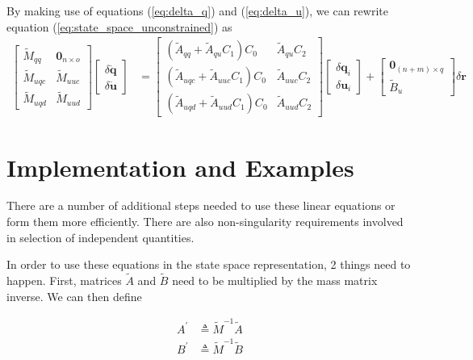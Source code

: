 \documentclass{svjour3}                     %
\begin{document}
By making use of equations (\ref{eq:delta_q}) and (\ref{eq:delta_u}), we can
rewrite equation (\ref{eq:state_space_unconstrained}) as
\begin{align}
  \label{eq:state_space_constrained}
  \left[
    \begin{array}{cc}
      \tilde{M}_{qq} & \bm{0}_{n \times o} \\
      \tilde{M}_{uqc} & \tilde{M}_{uuc} \\
      \tilde{M}_{uqd} & \tilde{M}_{uud}
    \end{array}
    \right]
    \left[
      \begin{array}{c}
        \delta \bm{\dot{q}} \\
        \delta \bm{\dot{u}}
      \end{array}
    \right]
   &=
   \left[
     \begin{array}{cc}
       (\tilde{A}_{qq} + \tilde{A}_{qu} C_1 ) C_0 & \tilde{A}_{qu} C_2 \\
       (\tilde{A}_{uqc} + \tilde{A}_{uuc} C_1 ) C_0 & \tilde{A}_{uuc} C_2\\
       (\tilde{A}_{uqd} + \tilde{A}_{uud} C_1 ) C_0 & \tilde{A}_{uud} C_2
     \end{array}
   \right]
    \left[
      \begin{array}{c}
        \delta \bm{q}_i \\
        \delta \bm{u}_i
      \end{array}
    \right]
    +
    \left[
      \begin{array}{c}
        \bm{0}_{(n+m) \times q} \\
        \tilde{B}_{u}
      \end{array}
    \right]
    \delta \bm{r}
\end{align}


\section{Implementation and Examples}

There are a number of additional steps needed to use these linear equations or
form them more efficiently. There are also non-singularity requirements
involved in selection of independent quantities.

In order to use these equations in the state space representation, 2 things
need to happen. First, matrices $\tilde{A}$ and $\tilde{B}$ need to be
multiplied by the mass matrix inverse. We can then define

\begin{align}
    A^\prime &\triangleq \tilde{M}^{-1} \tilde{A} \\
    B^\prime &\triangleq \tilde{M}^{-1} \tilde{B}
\end{align}
\end{document}

